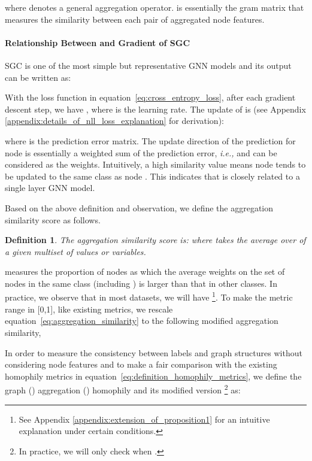 \documentclass{article}
\newcommand\ie{\textit{i.e.,}}
\newcommand{\0}{{\boldsymbol{0}}}
\newcommand{\6}{{\partial}}
\newcommand{\8}{{\infty}}
\newcommand{\4}{{\nabla}}
\def\eqref#1{equation~\ref{#1}}
\newtheorem{definition}{Definition}
\begin{document}
where  denotes a general aggregation operator.  is essentially the gram matrix that measures the similarity between each pair of aggregated node features.

\vspace{-0.2cm}
\paragraph{Relationship Between  and Gradient of SGC}
SGC \cite{wu2019simplifying} is one of the most simple but representative GNN models and its output can be written as:

With the loss function in \eqref{eq:cross_entropy_loss}, after each gradient descent step, we have , where  is the learning rate. The update of  is (see Appendix \ref{appendix:details_of_nll_loss_explanation} for  derivation):

where  is the prediction error matrix. The update direction of the prediction for node  is essentially a weighted sum of the prediction error, \ie{}  and  can be considered as the weights. Intuitively, a high similarity value  means node  tends to be updated to the same class as node . This indicates that  is closely related to a single layer GNN model.

Based on the above definition and observation, we define the aggregation similarity score as follows.



\begin{definition} The aggregation similarity score is: 
where  takes the average over  of a given multiset of values or variables.
\end{definition}
 measures the proportion of nodes  as which the average weights on the set of nodes in the same class (including ) is larger than that 
in other classes. In practice, we observe that in most datasets, we will have  \footnote{See Appendix \ref{appendix:extension_of_proposition1} for an intuitive explanation under certain conditions.}. To make the metric range in [0,1], like existing metrics, we rescale \eqref{eq:aggregation_similarity} to the following modified aggregation similarity, 

In order to measure the consistency between labels and graph structures without considering node features and to make a fair comparison with the existing homophily metrics in \eqref{eq:definition_homophily_metrics}, we define the graph () aggregation () homophily and its modified version \footnote{In practice, we will only check  when .} as:
\end{document}
